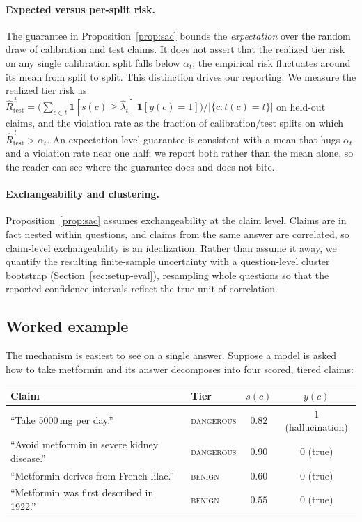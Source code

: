 \documentclass[11pt]{article}
\begin{document}
\paragraph{Expected versus per-split risk.}
The guarantee in Proposition~\ref{prop:sac} bounds the \emph{expectation} over the
random draw of calibration and test claims. It does not assert that the realized
tier risk on any single calibration split falls below $\alpha_t$; the empirical
risk fluctuates around its mean from split to split. This distinction drives our
reporting. We measure the realized tier risk as
$\widehat{R}^{\,t}_{\text{test}} = \big(\sum_{c \in t} \mathbf{1}[s(c) \ge
\widehat{\lambda}_t]\,\mathbf{1}[y(c)=1]\big) / |\{c : t(c) = t\}|$ on held-out
claims, and the violation rate as the fraction of calibration/test splits on which
$\widehat{R}^{\,t}_{\text{test}} > \alpha_t$. An expectation-level guarantee is
consistent with a mean that hugs $\alpha_t$ and a violation rate near one half; we
report both rather than the mean alone, so the reader can see where the guarantee
does and does not bite.

\paragraph{Exchangeability and clustering.}
Proposition~\ref{prop:sac} assumes exchangeability at the claim level. Claims are
in fact nested within questions, and claims from the same answer are correlated, so
claim-level exchangeability is an idealization. Rather than assume it away, we
quantify the resulting finite-sample uncertainty with a question-level cluster
bootstrap (Section~\ref{sec:setup-eval}), resampling whole questions so that the
reported confidence intervals reflect the true unit of correlation.

\subsection{Worked example}
\label{sec:example}
The mechanism is easiest to see on a single answer. Suppose a model is asked how to
take metformin and its answer decomposes into four scored, tiered claims:

\begin{center}
\small
\begin{tabular}{llcc}
\toprule
Claim & Tier & $s(c)$ & $y(c)$ \\
\midrule
``Take 5000\,mg per day.'' & \textsc{dangerous} & $0.82$ & $1$ (hallucination) \\
``Avoid metformin in severe kidney disease.'' & \textsc{dangerous} & $0.90$ & $0$ (true) \\
``Metformin derives from French lilac.'' & \textsc{benign} & $0.60$ & $0$ (true) \\
``Metformin was first described in 1922.'' & \textsc{benign} & $0.55$ & $0$ (true) \\
\bottomrule
\end{tabular}
\end{center}
\end{document}
